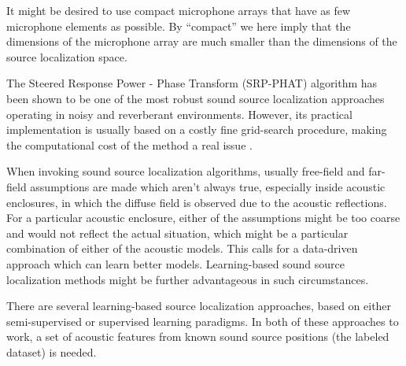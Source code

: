 \documentclass[applsci,article,submit,moreauthors,pdftex]{Definitions/mdpi}
\begin{document}
It might be desired to use compact microphone arrays that have as few microphone elements as possible. By ``compact'' we here imply that the dimensions of the microphone array are much smaller than the dimensions of the source localization space.

	

The Steered Response Power - Phase Transform (SRP-PHAT) algorithm \cite{dibiaseHighaccuracyLowlatencyTechnique2000} has been shown \cite{silvermanPerformanceRealtimeSourcelocation2005a} to be one of the most robust sound source localization approaches operating in noisy and reverberant environments. However, its practical implementation is usually based on a costly fine grid-search procedure, making the computational cost of the method a real issue \cite{martiSpeakerLocalizationDetection2011}.   

When invoking sound source localization algorithms, usually free-field and far-field assumptions are made which aren't always true, especially inside acoustic enclosures, in which the diffuse field is observed due to the acoustic reflections. 
For a particular acoustic enclosure, either of the assumptions might be too coarse and would not reflect the actual situation, which might be a particular combination of either of the acoustic models.
This calls for a data-driven approach which can learn better models.
Learning-based sound source localization methods might be further advantageous in such circumstances. 

There are several learning-based source localization approaches, based on either semi-supervised \cite{laufer-goldshteinSemiSupervisedSoundSource2016} or supervised \cite{heDeepNeuralNetworks2018b,heAdaptationMultipleSound2019,adavanneDirectionArrivalEstimation2017} learning paradigms. In both of these approaches to work, a set of acoustic features from known sound source positions (the labeled dataset) is needed. 
\end{document}
